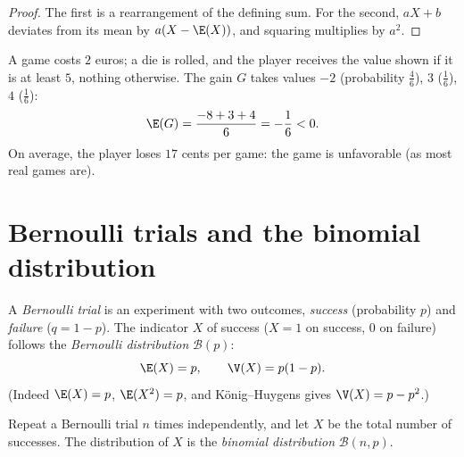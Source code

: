 \begin{proof}
The first is a rearrangement of the defining sum. For the second, $aX + b$
deviates from its mean by $a(X - \E(X))$, and squaring multiplies by
$a^2$.
\end{proof}

\begin{example}\label{ex:tle:randvar:game}
A game costs $2$ euros; a die is rolled, and the player receives the value
shown if it is at least $5$, nothing otherwise. The gain $G$ takes values
$-2$ (probability $\frac46$), $3$ ($\frac16$), $4$ ($\frac16$):
\[
\E(G) = \frac{-8 + 3 + 4}{6} = -\frac{1}{6} < 0 .
\]
On average, the player loses $17$ cents per game: the game is unfavorable
(as most real games are).
\end{example}

\section{Bernoulli trials and the binomial distribution}

\begin{definition}\label{def:tle:randvar:bernoulli}
A \emph{Bernoulli trial} is an experiment with two
outcomes, \emph{success} (probability $p$) and \emph{failure}
($q = 1 - p$). The indicator $X$ of success ($X = 1$ on success, $0$ on
failure) follows the \emph{Bernoulli distribution} $\mathcal B(p)$:
\[
\E(X) = p, \qquad \V(X) = p(1-p) .
\]
(Indeed $\E(X) = p$, $\E(X^2) = p$, and König--Huygens gives
$\V(X) = p - p^2$.)
\end{definition}

\begin{definition}\label{def:tle:randvar:binomial}
Repeat a Bernoulli trial $n$ times independently, and let $X$ be the total
number of successes. The distribution of $X$ is the \emph{binomial
distribution} $\mathcal B(n, p)$.
\end{definition}

